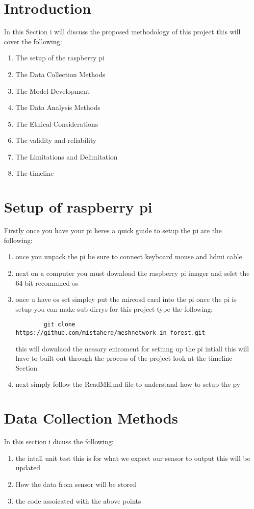 
\section{Introduction}
In this  Section  i will discuss the  proposed  methodology of this  project this will cover the  following:
\begin{enumerate}
    \item The setup of the raspberry pi
    \item The Data Collection Methods
    \item The Model Development
    \item The Data Analysis Methods
    \item The Ethical Considerations
    \item The validity and reliability 
    \item The Limitations and Delimitation
    \item The timeline
\end{enumerate} 
\section{Setup of raspberry pi}
Firstly once you have  your pi  heres  a  quick  guide to setup the pi are  the following:
\begin{enumerate}
    \item once you unpack the  pi be sure  to  connect keyboard mouse  and hdmi cable
    \item next on a computer you must download the  raspberry pi imager and  selet the  64 bit  recommned os 
    \item once u have os set simpley put the  mircosd card  into  the pi once the  pi is  setup you can make sub dirrys for this project type the  following:
    \begin{verbatim}
        git clone https://github.com/mistaherd/meshnetwork_in_forest.git
    \end{verbatim}
    this  will downlaod the  nessary  eniroment for  setinng up the  pi  intiall this will have to built out  through the  process of  the   project look at the timeline Section
    \item next simply follow the ReadME.md file  to  understand  how  to setup the py
\end{enumerate}
\section{Data Collection Methods}
In this section  i dicuss the  following:
\begin{enumerate}
    \item the  intall  unit test this is for  what we  expect  our  sensor  to  output this  will  be  updated
    \item How  the data  from sensor will be stored 
    \item the code  assoicated   with the above points 
\end{enumerate}

